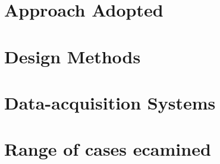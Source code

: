 \section{Approach Adopted}
\section{Design Methods}
\section{Data-acquisition Systems}
\section{Range of cases ecamined}